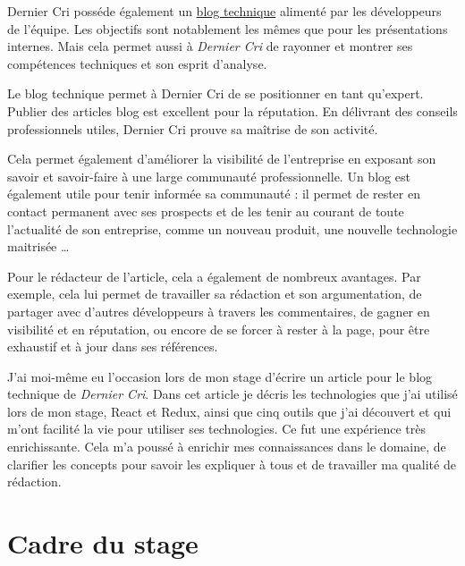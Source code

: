 \documentclass[12pt,a4paper]{article}
\begin{document}
  Dernier Cri posséde également un
  \href{http://derniercri.io/tech-blog}{blog technique} alimenté par les
  développeurs de l'équipe. Les objectifs sont notablement les mêmes que
  pour les présentations internes. Mais cela permet aussi à \emph{Dernier
  Cri} de rayonner et montrer ses compétences techniques et son esprit
  d'analyse.

  \bigskip

  Le blog technique permet à Dernier Cri de se positionner en tant
  qu'expert. Publier des articles blog est excellent pour la réputation.
  En délivrant des conseils professionnels utiles, Dernier Cri prouve sa
  maîtrise de son activité.

  \bigskip

  Cela permet également d'améliorer la visibilité de l'entreprise en
  exposant son savoir et savoir-faire à une large communauté
  professionnelle. Un blog est également utile pour tenir informée sa
  communauté : il permet de rester en contact permanent avec ses prospects
  et de les tenir au courant de toute l'actualité de son entreprise, comme
  un nouveau produit, une nouvelle technologie maitrisée \ldots{}

  \bigskip

  Pour le rédacteur de l'article, cela a également de nombreux avantages.
  Par exemple, cela lui permet de travailler sa rédaction et son
  argumentation, de partager avec d'autres développeurs à travers les
  commentaires, de gagner en visibilité et en réputation, ou encore de se
  forcer à rester à la page, pour être exhaustif et à jour dans ses
  références.

  \bigskip

  J'ai moi-même eu l'occasion lors de mon stage d'écrire un article pour
  le blog technique de \emph{Dernier Cri}. Dans cet article je décris les
  technologies que j'ai utilisé lors de mon stage, React et Redux, ainsi
  que cinq outils que j'ai découvert et qui m'ont facilité la vie pour
  utiliser ses technologies. Ce fut une expérience très enrichissante.
  Cela m'a poussé à enrichir mes connaissances dans le domaine, de
  clarifier les concepts pour savoir les expliquer à tous et de travailler
  ma qualité de rédaction.

  \newpage

  \section{Cadre du stage}\label{cadre-du-stage}
\end{document}
